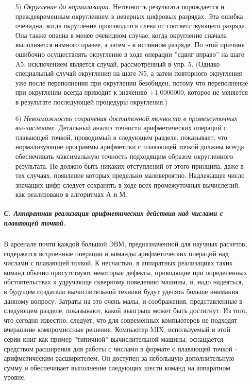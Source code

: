 {\begin{enumerate}
\item[5)] \textit{Округление до нормализации.} Неточность результата порождается и преждевременным округлением в неверных цифровых разрядах. Эта ошибка очевидна, когда округление производится слева от соответствующего разряда. Она также опасна в менее очевидном случае, когда округление сначала выполняется намного правее, а затем - в истинном разряде. По этой причине ошибочно осуществлять округление в ходе операции ''сдвиг вправо'' на шаге A5; исключением является случай, рассмотренный в упр. 5. (Однако специальный случай округления на шаге N5, а затем повторного округления уже после переполнения при округлении безобиден, потому что переполнение при округлении всегда приводит к значению $\pm 1.0000000$, которое не меняется в результате последующей процедуры округления.)

\item[6)] \textit{Невозможность сохранения достаточной точности в промежуточных вы-числениях.} Детальный анализ точности арифметических операций с плавающей точкой, проводимый в следующем разделе, показывает, что нормализующие программы арифметики с плавающей точкой должны всегда обеспечивать максимальную точность подходящим образом округленного результата. Не должно быть никаких отступлений от этого принципа, даже в тех случаях, появление которых предельно маловероятно. Надлежащее число значащих цифр следует сохранять в ходе всех промежуточных вычислений, как реализовано в алгоритмах А и М.
\end{enumerate}

\subparagraph{С. Аппаратная реализация арифметических действия над числами с плавающей точкой.} В арсенале почти каждой большой ЭВМ, предназначенной для научных расчетов, содержатся встроенные операции и команды арифметических операций над числами с плавающей точкой. К несчастью, в аппаратных реализациях таких команд обычно присутствуют некоторые дефекты, приводящие при определенных обстоятельствах к удручающе скверному поведению машины, и, надо надеяться, в будущем создатели вычислительной техники будут уделять больше внимания данному вопросу. Затраты на это очень малы, и соображения, представленные в следующем разделе, показывают, какой выигрыш может быть достигнут. Из того, что сегодня известно, следует, что для современных компьютеров не подходят вчерашние компромиссные решения.
Компьютер MIX, используемый в этой серии книг как пример ''типичной'' вычислительной машины, оснащается средством расширения для работы с числами в формате с плавающей точкой - арифметическим расширителем. Он доступен за небольшую дополнительную сумму и обеспечивает выполнение следующих шести команд на аппаратном уровне.

}
